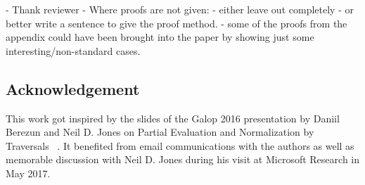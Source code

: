 \documentclass{elsarticle}
\theoremstyle{plain}
\theoremstyle{definition}
\begin{document}
\begin{todobox}
- Thank reviewer
- Where proofs are not given:
    - either leave out completely
    - or better  write a sentence to give the proof method.
    - some of the proofs from the appendix could have been brought into
    the paper by showing just some interesting/non-standard cases.
\end{todobox}






\subsection*{Acknowledgement}
This work got inspired by the slides of the Galop 2016 presentation by Daniil Berezun and Neil D. Jones on Partial Evaluation and Normalization by Traversals
~\cite{berezunjones_partialevalbytraversals}. It benefited from email communications with the authors as well as memorable discussion with Neil D. Jones during his visit at Microsoft Research in May 2017.
\end{document}
